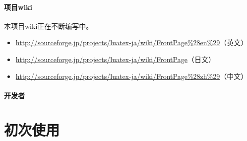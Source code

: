 \documentclass{ltjarticle}
\begin{document}
\paragraph{项目wiki} 本项目wiki正在不断编写中。
\begin{itemize}
\item \url{http://sourceforge.jp/projects/luatex-ja/wiki/FrontPage%28en%29}（英文）
\item \url{http://sourceforge.jp/projects/luatex-ja/wiki/FrontPage}（日文）
\item \url{http://sourceforge.jp/projects/luatex-ja/wiki/FrontPage%28zh%29}（中文）
\end{itemize}
\paragraph{开发者}
\begin{multienumerate}
\def\labelenumi{$\bullet$}
\end{multienumerate}
\section{初次使用}
\end{document}
